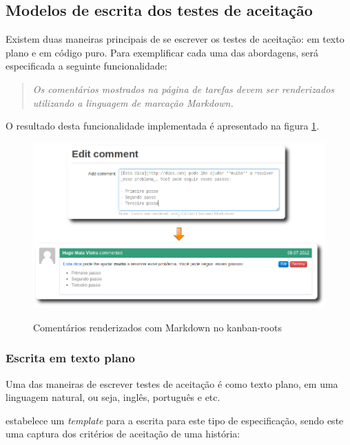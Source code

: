 

\subsection{Modelos de escrita dos testes de aceitação}
\label{sub:modelos_de_escrita_dos_testes_de_aceitacao}

Existem duas maneiras principais de se escrever os testes de aceitação: em texto plano e em código puro. Para exemplificar cada uma das abordagens, será especificada a seguinte funcionalidade:

\begin{quote}
\textit{Os comentários mostrados na página de tarefas devem ser renderizados utilizando a linguagem de marcação Markdown.}
\end{quote}

O resultado desta funcionalidade implementada é apresentado na figura \ref{img:markdown}.

\begin{figure}[h]
  \center
  \caption{Comentários renderizados com Markdown no kanban-roots}
  \includegraphics[scale=0.5]{images/markdown}
  \label{img:markdown}
\end{figure}

\subsubsection{Escrita em texto plano}
\label{ssub:escrita_em_texto_plano}

Uma das maneiras de escrever testes de aceitação é como texto plano, em uma linguagem natural, ou seja, inglês, português e etc.

 estabelece um \textit{template} para a escrita para este tipo de especificação, sendo este uma captura dos critérios de aceitação de uma história:

